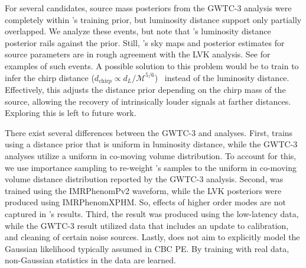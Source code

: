 \begin{refsection}
For several candidates, source mass posteriors from the GWTC-3 analysis were completely within \amplfi's training prior, but luminosity distance support only partially overlapped. 
We analyze these events, but note that \amplfi's luminosity distance posterior rails against the prior. 
Still, \amplfi's sky maps and posterior estimates for source parameters are in rough agreement with the LVK analysis. 
See  for examples of such events. 
A possible solution to this problem would be to train \amplfi to infer the chirp distance ($d_{\mathrm{chirp}} \propto d_L/\mathcal{M}^{5/6}$)~\cite{Roulet_2022, Brady_2008} instead of the luminosity distance. 
Effectively, this adjusts the distance prior depending on the chirp mass of the source, allowing the recovery of intrinsically louder signals at farther distances. 
Exploring this is left to future work.

There exist several differences between the GWTC-3 and \amplfi analyses. 
First, \amplfi trains using a distance prior that is uniform in luminosity distance, while the GWTC-3 analyses utilize a uniform in co-moving volume distribution. 
To account for this, we use importance sampling to re-weight \amplfi's samples to the uniform in co-moving volume distance distribution reported by the GWTC-3 analysis. 
Second, \amplfi was trained using the IMRPhenomPv2 waveform, while the LVK posteriors were produced using IMRPhenomXPHM. 
So, effects of higher order modes are not captured in \amplfi's results. 
Third, the \amplfi result was produced using the low-latency data, while the GWTC-3 result utilized data that includes an update to calibration, and cleaning of certain noise sources. 
Lastly, \amplfi does not aim to explicitly model the Gaussian likelihood typically assumed in CBC PE. 
By training with real data, non-Gaussian statistics in the data are learned.


\end{refsection}
